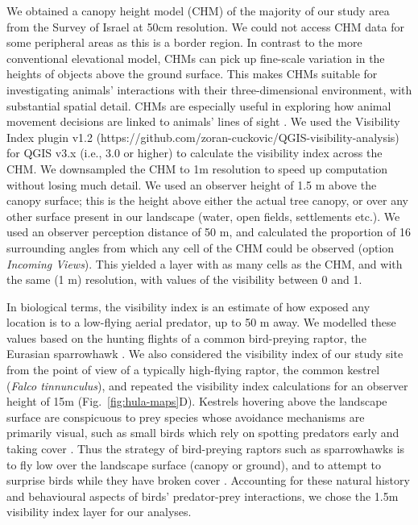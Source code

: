 We obtained a canopy height model (CHM) of the majority of our study area from the Survey of Israel at 50cm resolution.
We could not access CHM data for some peripheral areas as this is a border region.
In contrast to the more conventional elevational model, CHMs can pick up fine-scale variation in the heights of objects above the ground surface.
This makes CHMs suitable for investigating animals' interactions with their three-dimensional environment, with substantial spatial detail.
CHMs are especially useful in exploring how animal movement decisions are linked to animals' lines of sight \parencite{aben2018,aben2021}.
We used the Visibility Index plugin v1.2 (https://github.com/zoran-cuckovic/QGIS-visibility-analysis) for QGIS v3.x (i.e., 3.0 or higher) to calculate the visibility index across the CHM.
We downsampled the CHM to 1m resolution to speed up computation without losing much detail.
We used an observer height of 1.5 m above the canopy surface; this is the height above either the actual tree canopy, or over any other surface present in our landscape (water, open fields, settlements etc.).
We used an observer perception distance of 50 m, and calculated the proportion of 16 surrounding angles from which any cell of the CHM could be observed (option \textit{Incoming Views}).
This yielded a layer with as many cells as the CHM, and with the same (1 m) resolution, with values of the visibility between 0 and 1.

In biological terms, the visibility index is an estimate of how exposed any location is to a low-flying aerial predator, up to 50 m away.
We modelled these values based on the hunting flights of a common bird-preying raptor, the Eurasian sparrowhawk \parencite[\textit{Accipiter nisus}][]{seress2011,krams2001,krams2020}.
We also considered the visibility index of our study site from the point of view of a typically high-flying raptor, the common kestrel (\textit{Falco tinnunculus}), and repeated the visibility index calculations for an observer height of 15m (Fig.~\ref{fig:hula-maps}D).
Kestrels hovering above the landscape surface are conspicuous to prey species whose avoidance mechanisms are primarily visual, such as small birds which rely on spotting predators early and taking cover \parencite{krams2001,krams2020}.
Thus the strategy of bird-preying raptors such as sparrowhawks is to fly low over the landscape surface (canopy or ground), and to attempt to surprise birds while they have broken cover \parencite{krams2001,seress2011,krams2020}.
Accounting for these natural history and behavioural aspects of birds' predator-prey interactions, we chose the 1.5m visibility index layer for our analyses.

